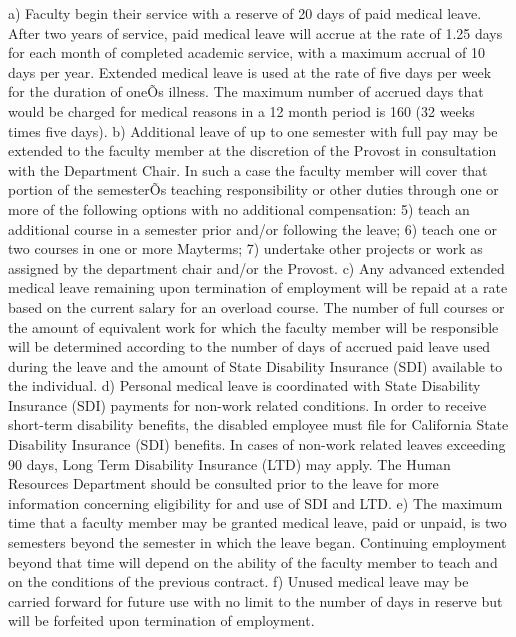 \documentclass[letterpaper, 11pt]{article}
\begin{document}
a) Faculty begin their service with a reserve of 20 days of paid medical leave.  After two years of service, paid medical leave will accrue at the rate of 1.25 days for each month of completed academic service, with a maximum accrual of 10 days per year.  Extended medical leave is used at the rate of five days per week for the duration of oneÕs illness. The maximum number of accrued days that would be charged for medical reasons in a 12 month period is 160 (32 weeks times five days).
b) Additional leave of up to one semester with full pay may be extended to the faculty member at the discretion of the Provost in consultation with the Department Chair.  In such a case the faculty member will cover that portion of the semesterÕs teaching responsibility or other duties through one or more of the following options with no additional compensation:
5) teach an additional course in a semester prior and/or following the leave;
6) teach one or two courses in one or more Mayterms;
7) undertake other projects or work as assigned by the department chair and/or the Provost.
c) Any advanced extended medical leave remaining upon termination of employment will be repaid at a rate based on the current salary for an overload course.
   The number of full courses or the amount of equivalent work for which the faculty member will be responsible will be determined according to the number of days of accrued paid leave used during the leave and the amount of State Disability Insurance (SDI) available to the individual.
d) Personal medical leave is coordinated with State Disability Insurance (SDI) payments for non-work related conditions. In order to receive short-term disability benefits, the disabled employee must file for California State Disability Insurance (SDI) benefits.  In cases of non-work related leaves exceeding 90 days, Long Term Disability Insurance (LTD) may apply.  The Human Resources Department should be consulted prior to the leave for more information concerning eligibility for and use of SDI and LTD.  
e) The maximum time that a faculty member may be granted medical leave, paid or unpaid, is two semesters beyond the semester in which the leave began.  Continuing employment beyond that time will depend on the ability of the faculty member to teach and on the conditions of the previous contract.
f) Unused medical leave may be carried forward for future use with no limit to the number of days in reserve but will be forfeited upon termination of employment.
   
\end{document}
